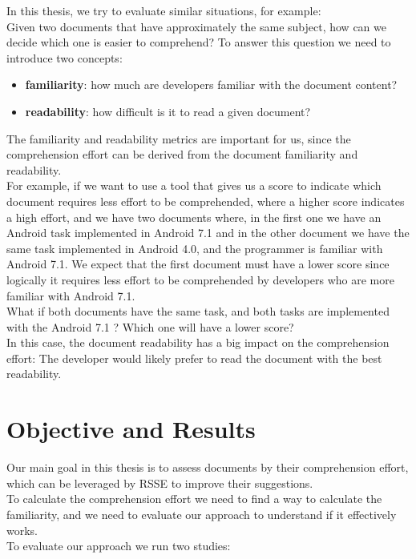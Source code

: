 \documentclass[12pt,mscthesis]{usiinfthesis}
\begin{document}
	In this thesis, we try to evaluate similar situations, for example:\\
	Given two documents that have approximately the same subject, how can we decide which one is easier to comprehend? To answer this question we need to introduce two concepts:
	\begin{itemize}
	\item \textbf{familiarity}: how much are developers familiar with the document content?
	\item \textbf{readability}: how difficult is it to read a given document?
	\end{itemize}
	The familiarity and readability metrics are important for us, since the comprehension effort can be derived from the document familiarity and readability.\\
	For example, if we want to use a tool that gives us a score to indicate which document requires less effort to be comprehended, where a higher score indicates a high effort, and we have two documents where, in the first one we have an Android task implemented in Android 7.1 and in the other document we have the same task implemented in Android 4.0, and the programmer is familiar with Android 7.1.
	We expect that the first document must have a lower score since logically it requires less effort to be comprehended by developers who are more familiar with Android 7.1.\\
	What if both documents have the same task, and both tasks are implemented with the Android 7.1 ? Which one will have a lower score? \\
	In this case, the document readability has a big impact on the comprehension effort: The developer would likely prefer to read the document with the best readability.\\
	
	\section{Objective and Results}
	Our main goal in this thesis is to assess documents by their comprehension effort, which can be leveraged by RSSE to improve their suggestions.\\
	To calculate the comprehension effort we need to find a way to calculate the familiarity, and we need to evaluate our approach to understand if it effectively works.\\

	To evaluate our approach we run two studies:
\end{document}
